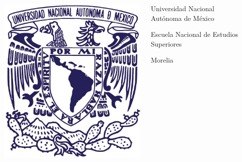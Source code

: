 \documentclass{beamer}
\begin{document}
    \begin{frame}[plain]
        
        \begin{columns}[T]
            \begin{column}{0.08\textwidth}
                \centering
                \includegraphics[width=\textwidth]{Resources/logo_unam.jpg}
            \end{column}
            \begin{column}{0.60\textwidth}
                \centering
                {\small Universidad Nacional Autónoma de México\par
                Escuela Nacional de Estudios Superiores\par
                Morelia}
            \end{column}
            \begin{column}{0.08\textwidth}
                \centering

\end{column}
\end{columns}
\end{frame}
\end{document}
